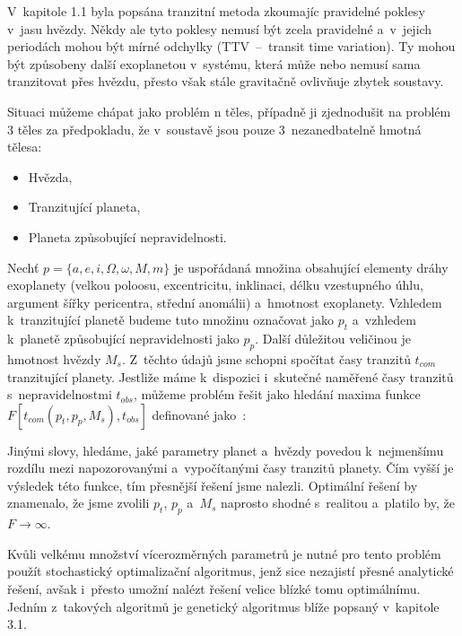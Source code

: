 \documentclass[a4paper,12pt]{article}
\begin{document}
{{{V~kapitole 1.1 byla popsána tranzitní metoda zkoumajíc pravidelné poklesy v~jasu hvězdy. Někdy ale tyto poklesy nemusí být zcela pravidelné a~v~jejich periodách mohou být mírné odchylky (TTV~--~transit time variation). Ty mohou být způsobeny další exoplanetou v~systému, která může nebo nemusí sama tranzitovat přes hvězdu, přesto však stále gravitačně ovlivňuje zbytek soustavy.~\cite{ttv}

Situaci můžeme chápat jako problém n těles, případně ji zjednodušit na problém 3 těles za předpokladu, že v~soustavě jsou pouze 3~nezanedbatelně hmotná tělesa:

\begin{itemize}
\item Hvězda,
\item Tranzitující planeta,
\item Planeta způsobující nepravidelnosti.
\end{itemize}

Nechť $p = \{a, e, i, \Omega, \omega, M, m\}$ je uspořádaná množina obsahující elementy dráhy exoplanety (velkou poloosu, excentricitu, inklinaci, délku vzestupného úhlu, argument šířky pericentra, střední anomálii) a~hmotnost exoplanety. Vzhledem k~tranzitující planetě budeme tuto množinu označovat jako $p_t$ a~vzhledem k~planetě způsobující nepravidelnosti jako $p_p$. Další důležitou veličinou je hmotnost hvězdy $M_s$. Z~těchto údajů jsme schopni spočítat časy tranzitů $t_{com}$ tranzitující planety. Jestliže máme k~dispozici i~skutečné naměřené časy tranzitů s~nepravidelnostmi $t_{obs}$, můžeme problém řešit jako hledání maxima funkce $F[t_{com}(p_t, p_p, M_s), t_{obs}]$ definované jako~\cite{ttv}:


Jinými slovy, hledáme, jaké parametry planet a~hvězdy povedou k~nejmenšímu rozdílu mezi napozorovanými a~vypočítanými časy tranzitů planety. Čím vyšší je výsledek této funkce, tím přesnější řešení jsme nalezli. Optimální řešení by znamenalo, že jsme zvolili $p_t$, $p_p$ a~$M_s$ naprosto shodné s~realitou a~platilo by, že $F\to\infty$.

Kvůli velkému množství vícerozměrných parametrů je nutné pro tento problém použít stochastický optimalizační algoritmus, jenž sice nezajistí přesné analytické řešení, avšak i~přesto umožní nalézt řešení velice blízké tomu optimálnímu. Jedním z~takových algoritmů je genetický algoritmus blíže popsaný v~kapitole 3.1.~\cite{ttv}

}}}
\end{document}
